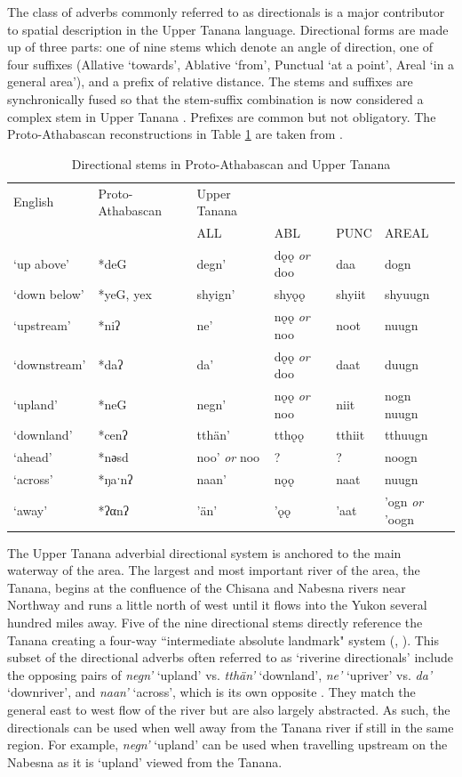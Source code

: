 The class of adverbs commonly referred to as directionals is a major contributor to spatial description in the Upper Tanana language. Directional forms are made up of three parts: one of nine stems which denote an angle of direction, one of four suffixes (Allative `towards', Ablative `from', Punctual `at a point', Areal `in a general area'), and a prefix of relative distance. The stems and suffixes are synchronically fused so that the stem-suffix combination is now considered a complex stem in Upper Tanana \citep[591]{LeerJ1989}. Prefixes are common but not obligatory. The Proto-Athabascan reconstructions in Table \ref{table:dir-adv} are taken from \citet[616]{LeerJ1989}.

\begin{table}
\caption{Directional stems in Proto-Athabascan and Upper Tanana}
\label{table:dir-adv}
\begin{tabular}{ l | l l l l l }
English & Proto-Athabascan & Upper Tanana \\
 & & ALL & ABL & PUNC & AREAL \\ \hline
‘up above’ & *deG & degn’ & dǫǫ {\em or} doo & daa & dogn \\
‘down below’ & *yeG, yex & shyign' & shyǫǫ & shyiit & shyuugn \\
‘upstream’ & *niʔ & ne' & nǫǫ {\em or} noo & noot & nuugn \\
‘downstream’ & *daʔ & da' & dǫǫ {\em or} doo & daat & duugn \\
‘upland’ & *neG & negn' & nǫǫ {\em or} noo & niit & nogn ~ nuugn \\
‘downland’ & *cenʔ & tthän' & tthǫǫ & tthiit & tthuugn \\
‘ahead’ & *nәsd & noo' {\em or} noo & ? & ? & noogn \\
‘across’ & *ŋaˑnʔ & naan' & nǫǫ & naat & nuugn \\
‘away’ & *ʔαnʔ & ’än' & ’ǫǫ & ’aat & ’ogn {\em or} ’oogn \\
\end{tabular}
\end{table}

The Upper Tanana adverbial directional system is anchored to the main waterway of the area. The largest and most important river of the area, the Tanana, begins at the confluence of the Chisana and Nabesna rivers near Northway and runs a little north of west until it flows into the Yukon several hundred miles away. Five of the nine directional stems directly reference the Tanana creating a four-way ``intermediate absolute landmark" system (\citealp[90-91]{LevinsonS2003}, \citealp[129]{KariJ2010}). This subset of the directional adverbs often referred to as `riverine directionals' include the opposing pairs of {\em negn'} `upland' vs. {\em tthän'} `downland',  {\em ne'} `upriver' vs. {\em da'} `downriver', and {\em naan'} `across', which is its own opposite \citep[576]{LeerJ1989}. They match the general east to west flow of the river but are also largely abstracted. As such, the directionals can be used when well away from the Tanana river if still in the same region. For example,  {\em negn'} `upland' can be used when travelling upstream on the Nabesna as it is `upland' viewed from the Tanana.

